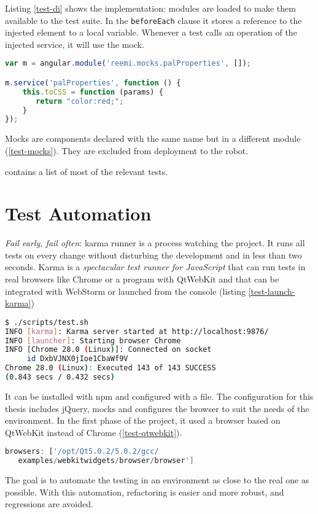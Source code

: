 

Listing \ref{test-di} shows the implementation: modules are loaded to make them available to the test suite.
In the \texttt{beforeEach} clause it stores a reference to the injected element to a local variable.
Whenever a test calls an operation of the injected service, it will use the mock.

\begin{lstlisting}[label=test-mocks,language=javascript, caption=Mocks]
var m = angular.module('reemi.mocks.palProperties', []);

m.service('palProperties', function () {
	this.toCSS = function (params) {
       return "color:red;";
	}
});
\end{lstlisting}

Mocks are components declared with the same name but in a different module (\ref{test-mocks}).
They are excluded from deployment to the robot.

 contains a list of most of the relevant tests.

\section{Test Automation}
\emph{Fail early, fail often}: karma runner is a process watching the project. 
It runs all tests on every change without disturbing the development and in less than two seconds.
Karma is a \textit{spectacular test runner for JavaScript} that can run tests in real browsers like Chrome or a program with QtWebKit and that can be integrated with WebStorm or launched from the console (listing \ref{test-launch-karma})

\begin{lstlisting}[label=test-launch-karma,language=bash, caption=Launching Karma Runner]
$ ./scripts/test.sh
INFO [karma]: Karma server started at http://localhost:9876/
INFO [launcher]: Starting browser Chrome
INFO [Chrome 28.0 (Linux)]: Connected on socket 
     id DxbVJNX0jIoe1CbaWf9V
Chrome 28.0 (Linux): Executed 143 of 143 SUCCESS 
(0.843 secs / 0.432 secs)
\end{lstlisting}

It can be installed with \ac{npm} and configured with a file.
The configuration for this thesis includes jQuery, mocks and configures the browser to suit the needs of  the environment.
In the first phase of the project, it used a browser based on QtWebKit instead of Chrome (\ref{test-qtwebkit}).

\begin{lstlisting}[label=test-qtwebkit,language=javascript, caption=Configuration to use QtWebkit browser]
browsers: ['/opt/Qt5.0.2/5.0.2/gcc/
   examples/webkitwidgets/browser/browser']
\end{lstlisting}

The goal is to automate the testing in an environment as close to the real one as possible.  
With this automation, refactoring is easier and more robust, and regressions are avoided.
